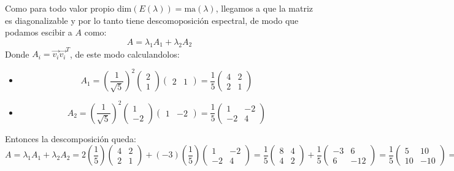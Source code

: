 \begin{itemize}
\begin{itemize}
        
    \end{itemize}
    Como para todo valor propio $\text{dim}(E(\lambda))=\text{ma}(\lambda)$, llegamos a que la matriz es diagonalizable y por lo tanto tiene descomoposici\'on espectral, de modo que podamos escibir a $A$ como:
    \[A=\lambda_1A_1+\lambda_2A_2\]
    Donde $A_i=\vec{v_i}\vec{v_i}^T$, de este modo calculandolos:
    \begin{itemize}
        \item \[A_1=\left(\frac{1}{\sqrt{5}}\right)^2\begin{pmatrix}2\\1\end{pmatrix}\begin{pmatrix}2&1\end{pmatrix}=\frac{1}{5}\begin{pmatrix}4&2\\2&1\end{pmatrix}\]
        \item \[A_2=\left(\frac{1}{\sqrt{5}}\right)^2\begin{pmatrix}1\\-2\end{pmatrix}\begin{pmatrix}1&-2\end{pmatrix}=\frac{1}{5}\begin{pmatrix}1&-2\\-2&4\end{pmatrix}\]
    \end{itemize}
    Entonces la descomposición queda:
    \[A=\lambda_1A_1+\lambda_2A_2=2\left(\frac{1}{5}\right)\begin{pmatrix}4&2\\2&1\end{pmatrix}+(-3)\left(\frac{1}{5}\right)\begin{pmatrix}1&-2\\-2&4\end{pmatrix}=\frac{1}{5}\begin{pmatrix}8&4\\4&2\end{pmatrix}+\frac{1}{5}\begin{pmatrix}-3&6\\6&-12\end{pmatrix}=\frac{1}{5}\begin{pmatrix}5&10\\10&-10\end{pmatrix}=\begin{pmatrix}1&2\\ \:2&-2\end{pmatrix}\]


\end{itemize}
